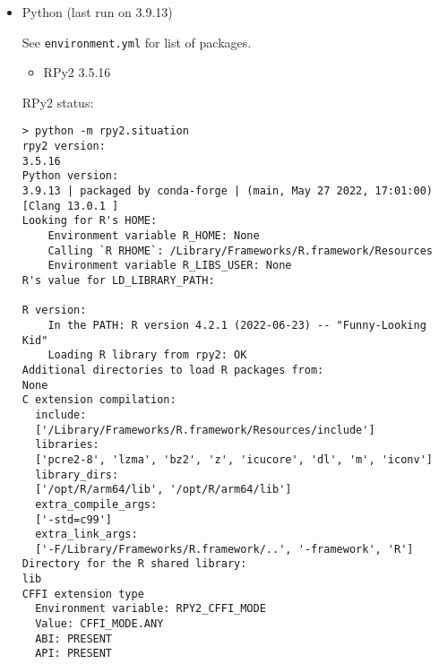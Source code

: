 \documentclass[10pt]{article}
\providecommand{\tightlist}{%
  \setlength{\itemsep}{0pt}\setlength{\parskip}{0pt}}
\begin{document}
\begin{itemize}
\item
  Python (last run on 3.9.13)

  See \texttt{environment.yml} for list of packages. 

  \begin{itemize}
    \item RPy2 3.5.16
  \end{itemize}

  RPy2 status:

{\scriptsize  \begin{verbatim}
> python -m rpy2.situation
rpy2 version:
3.5.16
Python version:
3.9.13 | packaged by conda-forge | (main, May 27 2022, 17:01:00)
[Clang 13.0.1 ]
Looking for R's HOME:
    Environment variable R_HOME: None
    Calling `R RHOME`: /Library/Frameworks/R.framework/Resources
    Environment variable R_LIBS_USER: None
R's value for LD_LIBRARY_PATH:

R version:
    In the PATH: R version 4.2.1 (2022-06-23) -- "Funny-Looking Kid"
    Loading R library from rpy2: OK
Additional directories to load R packages from:
None
C extension compilation:
  include:
  ['/Library/Frameworks/R.framework/Resources/include']
  libraries:
  ['pcre2-8', 'lzma', 'bz2', 'z', 'icucore', 'dl', 'm', 'iconv']
  library_dirs:
  ['/opt/R/arm64/lib', '/opt/R/arm64/lib']
  extra_compile_args:
  ['-std=c99']
  extra_link_args:
  ['-F/Library/Frameworks/R.framework/..', '-framework', 'R']
Directory for the R shared library:
lib
CFFI extension type
  Environment variable: RPY2_CFFI_MODE
  Value: CFFI_MODE.ANY
  ABI: PRESENT
  API: PRESENT
  \end{verbatim}}



\end{itemize}
\end{document}
